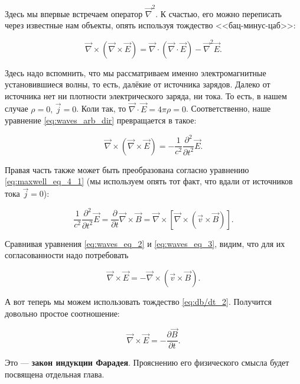 \documentclass[a4paper,12pt]{article}
\numberwithin{equation}{section}
\newcommand{\pt}{\partial}
\newcommand{\vn}{\vec{\nabla}}
\begin{document}
Здесь мы впервые встречаем оператор $\vn^2$. К счастью, его можно
переписать через известные нам объекты, опять используя тождество
<<бац-минус-цаб>>: 

\begin{equation}
  \label{eq:bac_cab_2}
  \vn \times \left( \vn \times \vec{E}  \right) = \vn \cdot \left( \vn
  \cdot \vec{E} \right) - \vn^2 \vec{E}.
\end{equation}

Здесь надо вспомнить, что мы рассматриваем именно электромагнитные
установившиеся волны, то есть, далёкие от источника зарядов. Далеко от
источника нет ни плотности электрического заряда, ни тока. То есть, в
нашем случае $\rho=0, \, \vec{j}=0$. Коли так, то $\vn \cdot \vec{E}
= 4 \pi \rho=0$. Соответственно, наше уравнение
\eqref{eq:waves_arb_dir} превращается в такое: 

\begin{equation}
  \label{eq:waves_eq_2}
  \vn \times \left( \vn \times \vec{E}  \right) = - \frac{1}{c^2} \frac{\pt^2}{\pt t^2} \vec{E}.
\end{equation}

Правая часть также может быть преобразована согласно уравнению
\eqref{eq:maxwell_eq_4_1} (мы используем опять тот факт, что вдали
от источников тока $\vec{j}=0$):

\begin{equation}
  \label{eq:waves_eq_3}
  \frac{1}{c^2} \frac{\pt^2}{\pt t^2} \vec{E} =
  \frac{\pt}{\pt t} \vn \times \vec{B} =  \vn \times \left[
  \vn \times \left( \vec{v} \times \vec{B}  \right)\right].
\end{equation}

Сравнивая уравнения \eqref{eq:waves_eq_2} и \eqref{eq:waves_eq_3},
видим, что для их согласованности надо потребовать

\begin{equation}
  \label{eq:waves_eq_4}
  \vn \times \vec{E} = - \vn \times \left( \vec{v} \times \vec{B}  \right).
\end{equation}

А вот теперь мы можем использовать тождество
\eqref{eq:db/dt_2}. Получится довольно простое соотношение: 

\begin{equation}
  \label{eq:faradays_law}
  \vn \times \vec{E} = -\frac{\pt \vec{B}}{\pt t}.
\end{equation}

Это --- \textbf{закон индукции Фарадея}. Прояснению его физического
смысла будет посвящена отдельная глава. 
\end{document}
